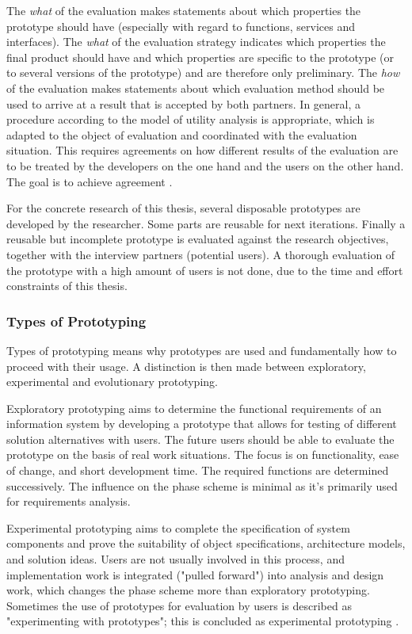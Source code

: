The \textit{what} of the evaluation makes statements about which properties the prototype should have
(especially with regard to functions, services and interfaces).
The \textit{what} of the evaluation strategy indicates which properties the final product should have and which properties are specific to the prototype
(or to several versions of the prototype) and are therefore only preliminary.
The \textit{how} of the evaluation makes statements about which evaluation method should be used to arrive at a result that is accepted by both partners.
In general, a procedure according to the model of utility analysis is appropriate, which is adapted to the object of evaluation
and coordinated with the evaluation situation. This requires agreements on how different results of the evaluation are to be treated
by the developers on the one hand and the users on the other hand. The goal is to achieve agreement
\autocite{riedlManagementInformatik2019}.

For the concrete research of this thesis,
several disposable prototypes are developed
by the researcher.
Some parts are reusable for next iterations.
Finally a reusable but incomplete prototype is evaluated against the research objectives,
together with the interview partners (potential users).
A thorough evaluation of the prototype with a high amount of users is not done,
due to the time and effort constraints of this thesis.

\subsubsection*{Types of Prototyping}

Types of prototyping means why prototypes are used and fundamentally how to proceed with their usage.
A distinction is then made between exploratory, experimental and evolutionary prototyping.

Exploratory prototyping aims to determine the functional requirements of an information system by developing a prototype that allows for testing of different solution alternatives with users.
The future users should be able to evaluate the prototype on the basis of real work situations.
The focus is on functionality, ease of change, and short development time.
The required functions are determined successively.
The influence on the phase scheme is minimal as it's primarily used for requirements analysis.

Experimental prototyping aims to complete the specification of system components and
prove the suitability of object specifications, architecture models, and solution ideas.
Users are not usually involved in this process, and implementation work is integrated ("pulled forward") into analysis and design work,
which changes the phase scheme more than exploratory prototyping.
Sometimes the use of prototypes for evaluation by users is described as "experimenting with prototypes";
this is concluded as experimental prototyping
\autocite{riedlManagementInformatik2019}.

